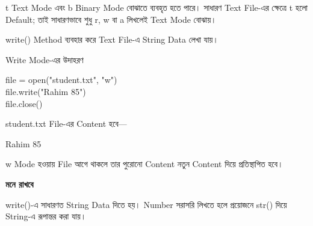 \textenglish{\ttfamily t} Text Mode এবং \textenglish{\ttfamily b} Binary
Mode বোঝাতে ব্যবহৃত হতে পারে। সাধারণ Text File-এর ক্ষেত্রে
\textenglish{\ttfamily t} হলো Default; তাই সাধারণভাবে শুধু
\textenglish{\ttfamily r}, \textenglish{\ttfamily w} বা
\textenglish{\ttfamily a} লিখলেই Text Mode বোঝায়।



\textenglish{\ttfamily write()} Method ব্যবহার করে Text File-এ String
Data লেখা যায়।

\begin{codeoutputbox}{Write Mode-এর উদাহরণ}
\noindent
\begin{minipage}[t]{0.54\linewidth}
\vspace{0pt}
\codeheading
\begin{english}
\ttfamily
file = open("student.txt", "w")\\
file.write("Rahim 85")\\
file.close()
\end{english}
\end{minipage}
\hfill
\begin{minipage}[t]{0.42\linewidth}
\vspace{0pt}
\outputheading

\textenglish{\ttfamily student.txt} File-এর Content হবে—

\begin{center}
\textenglish{\ttfamily Rahim 85}
\end{center}

\textenglish{\ttfamily w} Mode হওয়ায় File আগে থাকলে তার পুরোনো Content
নতুন Content দিয়ে প্রতিস্থাপিত হবে।
\end{minipage}
\end{codeoutputbox}

\begin{rememberbox}
\textbf{\color{deepOrange}মনে রাখবে}

\textenglish{\ttfamily write()}-এ সাধারণত String Data দিতে হয়।
Number সরাসরি লিখতে হলে প্রয়োজনে \textenglish{\ttfamily str()} দিয়ে
String-এ রূপান্তর করা যায়।
\end{rememberbox}



